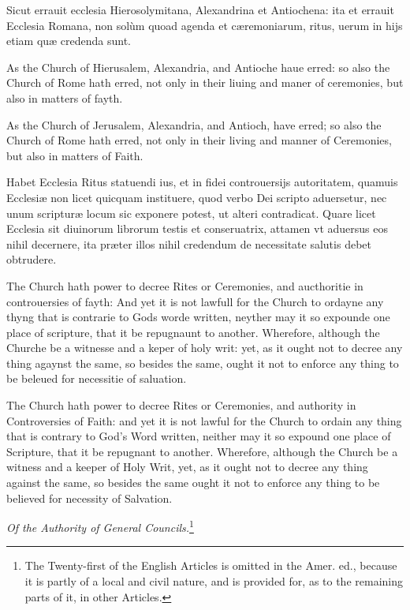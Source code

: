 Sicut errauit ecclesia Hierosolymitana, Alexandrina et Antiochena: ita et errauit Ecclesia Romana, non solùm quoad agenda et cæremoniarum, ritus, uerum in hijs etiam quæ credenda sunt.

As the Church of Hierusalem, Alexandria, and Antioche haue erred: so also the Church of Rome hath erred, not only in their liuing and maner of ceremonies, but also in matters of fayth.

As the Church of Jerusalem, Alexandria, and Antioch, have erred; so also the Church of Rome hath erred, not only in their living and manner of Ceremonies, but also in matters of Faith.


Habet Ecclesia Ritus statuendi ius, et in fidei controuersijs autoritatem, quamuis Ecclesiæ non licet quicquam instituere, quod verbo Dei scripto aduersetur, nec unum scripturæ locum sic exponere potest, ut alteri contradicat. Quare licet Ecclesia sit diuinorum librorum testis et conseruatrix, attamen vt aduersus eos nihil decernere, ita præter illos nihil credendum de necessitate salutis debet obtrudere.

The Church hath power to decree Rites or Ceremonies, and aucthoritie in controuersies of fayth: And yet it is not lawfull for the Church to ordayne any thyng that is contrarie to Gods worde written, neyther may it so expounde one place of scripture, that it be repugnaunt to another. Wherefore, although the Churche be a witnesse and a keper of holy writ: yet, as it ought not to decree any thing agaynst the same, so besides the same, ought it not to enforce any thing to be beleued for necessitie of saluation.

The Church hath power to decree Rites or Ceremonies, and authority in Controversies of Faith: and yet it is not lawful for the Church to ordain any thing that is contrary to God's Word written, neither may it so expound one place of Scripture, that it be repugnant to another. Wherefore, although the Church be a witness and a keeper of Holy Writ, yet, as it ought not to decree any thing against the same, so besides the same ought it not to enforce any thing to be believed for necessity of Salvation.


\emph{Of the Authority of General Councils.}\footnote{The Twenty-first of the English Articles is omitted in the Amer. ed., because it is partly of a local and civil nature, and is provided for, as to the remaining parts of it, in other Articles.}

